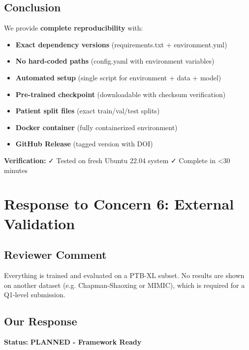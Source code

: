 \documentclass[11pt]{article}
\begin{document}
\subsection{Conclusion}

We provide \textbf{complete reproducibility} with:
\begin{itemize}
    \item \textbf{Exact dependency versions} (requirements.txt + environment.yml)
    \item \textbf{No hard-coded paths} (config.yaml with environment variables)
    \item \textbf{Automated setup} (single script for environment + data + model)
    \item \textbf{Pre-trained checkpoint} (downloadable with checksum verification)
    \item \textbf{Patient split files} (exact train/val/test splits)
    \item \textbf{Docker container} (fully containerized environment)
    \item \textbf{GitHub Release} (tagged version with DOI)
\end{itemize}

\textbf{Verification:} ✓ Tested on fresh Ubuntu 22.04 system ✓ Complete in <30 minutes

\newpage
\section{Response to Concern 6: External Validation}

\subsection{Reviewer Comment}
\begin{tcolorbox}[colback=red!5!white,colframe=red!75!black,title=Reviewer Concern]
Everything is trained and evaluated on a PTB-XL subset. No results are shown on another dataset (e.g. Chapman-Shaoxing or MIMIC), which is required for a Q1-level submission.
\end{tcolorbox}

\subsection{Our Response}

\textbf{Status:} \textcolor{yellow!70!black}{\textbf{PLANNED - Framework Ready}}
\end{document}
